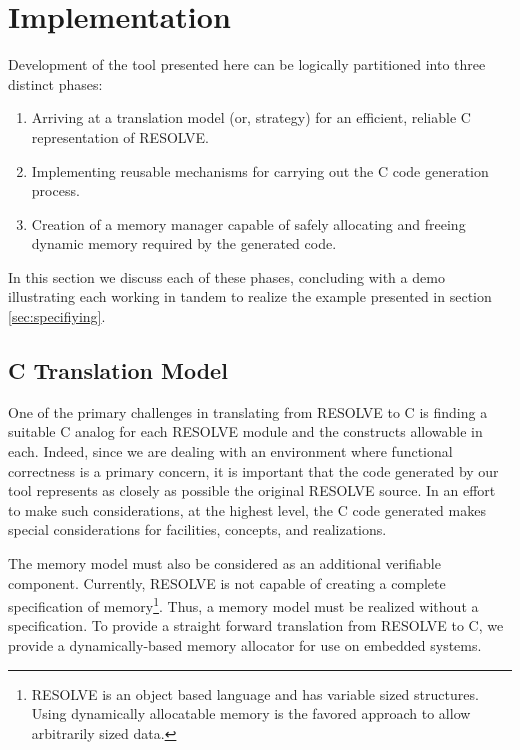 \documentclass{sig-alternate}
\begin{document}
\section{Implementation}
Development of the tool presented here can be logically partitioned into three distinct phases: 
\begin{enumerate}
\item Arriving at a translation model (or, strategy) for an efficient, reliable C representation of RESOLVE.
\item Implementing reusable mechanisms for carrying out the C code generation process.
\item Creation of a memory manager capable of safely allocating and freeing dynamic memory required by the generated code.
\end{enumerate}
In this section we discuss each of these phases, concluding with a demo illustrating each working in tandem to realize the example presented in section \ref{sec:specifiying}.

\subsection{C Translation Model}
One of the primary challenges in translating from RESOLVE to C is finding a suitable C analog for each RESOLVE module and the constructs allowable in each. Indeed, since we are dealing with an environment where functional correctness is a primary concern, it is important that the code generated by our tool represents as closely as possible the original RESOLVE source. In an effort to make such considerations, at the highest level, the C code generated makes special considerations for facilities, concepts, and realizations. 

The memory model must also be considered as an additional verifiable component. Currently, RESOLVE is not capable of creating a complete specification of memory\footnote{RESOLVE is an object based language and has variable sized structures. Using dynamically allocatable memory is the favored approach to allow arbitrarily sized data.}. Thus, a memory model must be realized without a specification. To provide a straight forward translation from RESOLVE to C, we provide a dynamically-based memory allocator for use on embedded systems.
\end{document}
